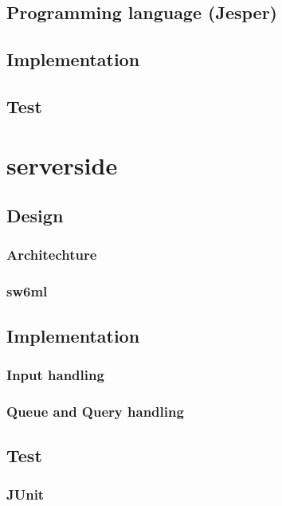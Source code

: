      \subsection{Programming language (Jesper)}
      
     \subsection{Implementation}
     \subsection{Test}

  \section{serverside} %
    
    \subsection{Design}
      
      \subsubsection{Architechture} %
	  
      \subsubsection{sw6ml} %
         \label{sw6ml}
	  
	  
    \subsection{Implementation}
      \subsubsection{Input handling} %
		
      \subsubsection{Queue and Query handling} %
	  \label{QQHandling}
    \subsection{Test}
      \subsubsection{JUnit}
